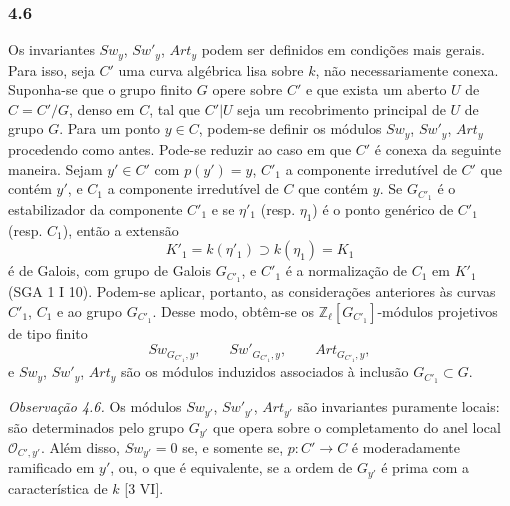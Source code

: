 \subsubsection*{4.6}

Os invariantes $Sw_y$, $Sw'_y$, $Art_y$ podem ser definidos em condições mais gerais. Para isso, seja $C'$ uma curva algébrica lisa sobre $k$, não necessariamente conexa. Suponha-se que o grupo finito $G$ opere sobre $C'$ e que exista um aberto $U$ de $C=C'/G$, denso em $C$, tal que $C'|U$ seja um recobrimento principal de $U$ de grupo $G$. Para um ponto $y\in C$, podem-se definir os módulos $Sw_y$, $Sw'_y$, $Art_y$ procedendo como antes. Pode-se reduzir ao caso em que $C'$ é conexa da seguinte maneira. Sejam $y'\in C'$ com $p(y')=y$, $C'_1$ a componente irredutível de $C'$ que contém $y'$, e $C_1$ a componente irredutível de $C$ que contém $y$. Se $G_{C'_1}$ é o estabilizador da componente $C'_1$ e se $\eta'_1$ (resp. $\eta_1$) é o ponto genérico de $C'_1$ (resp. $C_1$), então a extensão
\[
K'_1=k(\eta'_1)\supset k(\eta_1)=K_1
\]
é de Galois, com grupo de Galois $G_{C'_1}$, e $C'_1$ é a normalização de $C_1$ em $K'_1$ (SGA 1 I 10). Podem-se aplicar, portanto, as considerações anteriores às curvas $C'_1$, $C_1$ e ao grupo $G_{C'_1}$. Desse modo, obtêm-se os $\mathbb Z_\ell[G_{C'_1}]$-módulos projetivos de tipo finito
\[
Sw_{G_{C'_1},y},\qquad Sw'_{G_{C'_1},y},\qquad Art_{G_{C'_1},y},
\]
e $Sw_y$, $Sw'_y$, $Art_y$ são os módulos induzidos associados à inclusão $G_{C'_1}\subset G$.

\textit{Observação 4.6.} Os módulos $Sw_{y'}$, $Sw'_{y'}$, $Art_{y'}$ são invariantes puramente locais: são determinados pelo grupo $G_{y'}$ que opera sobre o completamento do anel local $\mathcal O_{C',y'}$. Além disso, $Sw_{y'}=0$ se, e somente se, $p:C'\to C$ é moderadamente ramificado em $y'$, ou, o que é equivalente, se a ordem de $G_{y'}$ é prima com a característica de $k$ [3 VI].
